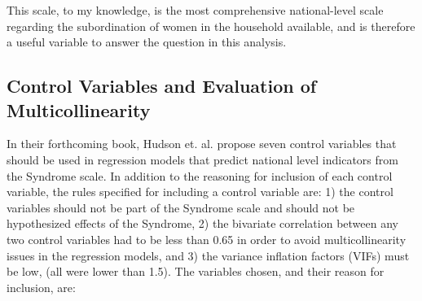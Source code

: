 This scale, to my knowledge, is the most comprehensive national-level scale regarding the subordination of women in the household available, and is therefore a useful variable to answer the question in this analysis.

\subsection{Control Variables and Evaluation of Multicollinearity}

In their forthcoming book, Hudson et. al. propose seven control variables that should be used in regression models that predict national level indicators from the Syndrome scale. In addition to the reasoning for inclusion of each control variable, the rules specified for including a control variable are: 1) the control variables should not be part of the Syndrome scale and should not be hypothesized effects of the Syndrome, 2) the bivariate correlation between any two control variables had to be less than 0.65 in order to avoid multicollinearity issues in the regression models, and 3) the variance inflation factors (VIFs) must be low, (all were lower than 1.5). The variables chosen, and their reason for inclusion, are:

